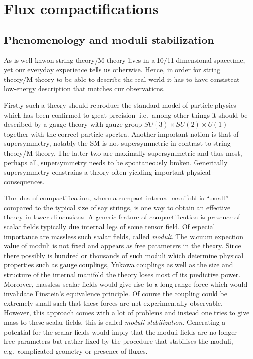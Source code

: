 \chapter{Flux compactifications}

\section{Phenomenology and moduli stabilization}
As is well-knwon string theory/M-theory lives in a 10/11-dimensional spacetime, yet our everyday experience tells us otherwise. Hence, in order for string theory/M-theory to be able to describe the real world it has to have consistent low-energy description that matches our observations. 

Firstly such a theory should reproduce the standard model of particle physics which has been confirmed to great precision, i.e.\ among other things it should be described by a gauge theory with gauge group $SU(3)\times SU(2)\times U(1)$ together with the correct particle spectra. Another important notion is that of supersymmetry, notably the SM is not supersymmetric in contrast to string theory/M-theory. The latter two are maximally supersymmetric and thus most, perhaps all, supersymmetry needs to be spontaneously broken. Generically supersymmetry constrains a theory often yielding important physical consequences.

The idea of compactification, where a compact internal manifold is ``small'' compared to the typical size of say strings, is one way to obtain an effective theory in lower dimensions. A generic feature of compactification is presence of scalar fields typically due internal legs of some tensor field. Of especial importance are massless such scalar fields, called \emph{moduli}. The vacuum expection value of moduli is not fixed and appears as free parameters in the theory. Since there possibly is hundred or thousands of such moduli which determine physical properties such as gauge couplings, Yukawa couplings as well as the size and structure of the internal manifold the theory loses most of its predictive power. Moreover, massless scalar fields would give rise to a long-range force which would invalidate Einstein's equivalence principle. Of course the coupling could be extremely small such that these forces are not experimentally observable. However, this approach comes with a lot of problems  and instead one tries to give mass to these scalar fields, this is called \emph{moduli stabilization}. Generating a potential for the scalar fields would imply that the moduli fields are no longer free parameters but rather fixed by the procedure that stabilises the moduli, e.g.\ complicated geometry or presence of fluxes. 

